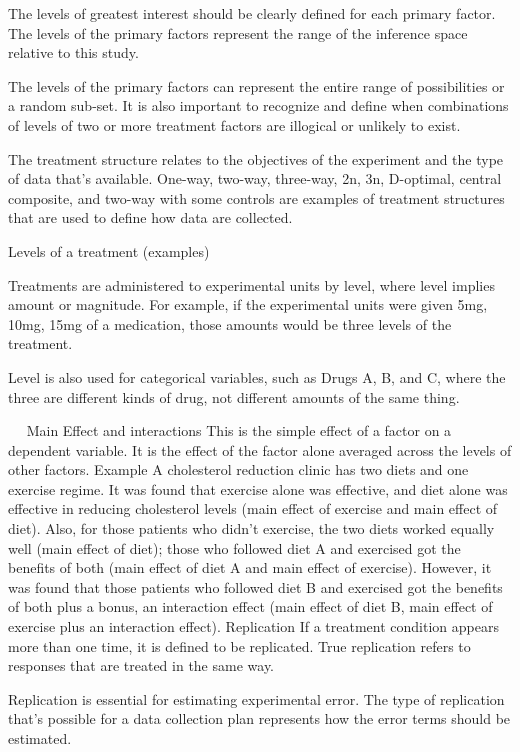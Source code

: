 The levels of greatest interest should be clearly defined for each primary factor. The levels of the primary factors represent the range of the inference space relative to this study. 

The levels of the primary factors can represent the entire range of possibilities or a random sub-set. It is also important to recognize and define when combinations of levels of two or more treatment factors are illogical or unlikely to exist.

The treatment structure relates to the objectives of the experiment and the type of data that’s available. One-way, two-way, three-way, 2n, 3n, D-optimal, central composite, and two-way with some controls are examples of treatment structures that are used to define how
data are collected. 

Levels of a treatment (examples)

Treatments are administered to experimental units by level, where level implies amount or magnitude. For example, if the experimental units were given 5mg, 10mg, 15mg of a medication, those amounts would be three levels of the treatment. 

Level is also used for categorical variables, such as Drugs A, B, and C, where the three are different kinds of drug, not different amounts of the same thing.


 
Main Effect and interactions
This is the simple effect of a factor on a dependent variable. It is the effect of the factor alone averaged across the levels of other factors.
Example 
A cholesterol reduction clinic has two diets and one exercise regime. It was found that exercise alone was effective, and diet alone was effective in reducing cholesterol levels (main effect of exercise and main effect of diet).  
Also, for those patients who didn't exercise, the two diets worked equally well (main effect of diet); those who followed diet A and exercised got the benefits of both (main effect of diet A and main effect of exercise). 
However, it was found that those patients who followed diet B and exercised got the benefits of both plus a bonus, an interaction effect (main effect of diet B, main effect of exercise plus an interaction effect).
Replication
If a treatment condition appears more than one time, it is defined to be replicated. True replication refers to responses that are treated in the same way. 

Replication is essential for estimating experimental error. The type of replication that’s possible for a data collection plan represents how the error terms should be estimated. 

